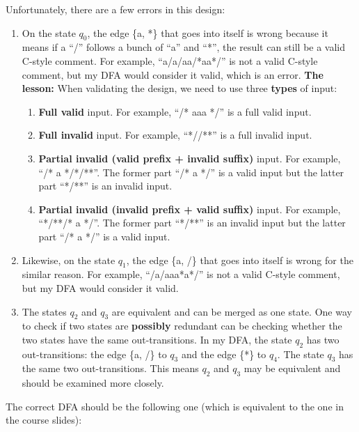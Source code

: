 \documentclass[12pt, letterpaper, oneside]{book}
\begin{document}
Unfortunately, there are a few errors in this design:
\begin{enumerate}
  \item On the state $q_0$, the edge \{a, *\} that goes into itself is wrong because it means if a ``/'' follows a
        bunch of ``a'' and ``*'', the result can still be a valid C-style comment. For example, ``a/a/aa/*aa*/'' is
        not a valid C-style comment, but my DFA would consider it valid, which is an error. \textbf{The lesson:} When
        validating the design, we need to use three \textbf{types} of input:
        \begin{enumerate}
          \item \textbf{Full valid} input. For example, ``/* aaa */'' is a full valid input.
          \item \textbf{Full invalid} input. For example, ``*//**'' is a full invalid input.
          \item \textbf{Partial invalid (valid prefix + invalid suffix)} input. For example, ``/* a */*/**''. The
                former part ``/* a */'' is a valid input but the latter part ``*/**'' is an invalid input.
          \item \textbf{Partial invalid (invalid prefix + valid suffix)} input. For example, ``*/**/* a */''. The
                former part ``*/**'' is an invalid input but the latter part ``/* a */'' is a valid input.
        \end{enumerate}
  \item Likewise, on the state $q_1$, the edge \{a, /\} that goes into itself is wrong for the similar reason. For
        example, ``/a/aaa*a*/'' is not a valid C-style comment, but my DFA would consider it valid.
  \item The states $q_2$ and $q_3$ are equivalent and can be merged as one state. One way to check if two states are
        \textbf{possibly} redundant can be checking whether the two states have the same out-transitions. In my DFA,
        the state $q_2$ has two out-transitions: the edge \{a, /\} to $q_3$ and the edge \{*\} to $q_4$. The state
        $q_3$ has the same two out-transitions. This means $q_2$ and $q_3$ may be equivalent and should be examined
        more closely.
\end{enumerate}

The correct DFA should be the following one (which is equivalent to the one in the course slides):
\end{document}
